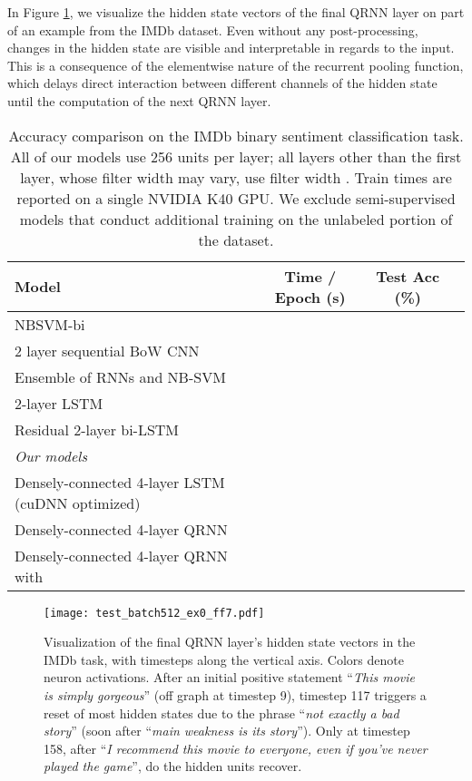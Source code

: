 \documentclass{article} \usepackage{iclr2017_conference,times}
\begin{document}
In Figure \ref{fig:IMDBviz}, we visualize the hidden state vectors  of the final QRNN layer on part of an example from the IMDb dataset.
Even without any post-processing, changes in the hidden state are visible and interpretable in regards to the input. This is a consequence of the elementwise nature of the recurrent pooling function, which delays direct interaction between different channels of the hidden state until the computation of the next QRNN layer.

\begin{table*}
\center
\begin{tabular}{l|ccc}
\toprule
\bf Model & \bf Time / Epoch (s) & \bf Test Acc (\%) \\
\midrule
NBSVM-bi \citep{Wang2012} &  & \\
2 layer sequential BoW CNN \citep{Johnson2014} &  &  \\
Ensemble of RNNs and NB-SVM \citep{Mesnil2014} &  &  \\
2-layer LSTM \citep{Longpre2016} &  &  \\
Residual 2-layer bi-LSTM \citep{Longpre2016} &  &  \\
\midrule
{\it Our models}\\
Densely-connected 4-layer LSTM (cuDNN optimized) &  &  \\
Densely-connected 4-layer QRNN &  &  \\
Densely-connected 4-layer QRNN with  &  &  \\
\bottomrule
\end{tabular}
\caption{
Accuracy comparison on the IMDb binary sentiment classification task. All of our models use 256 units per layer; all layers other than the first layer, whose filter width may vary, use filter width . Train times are reported on a single NVIDIA K40 GPU. We exclude semi-supervised models that conduct additional training on the unlabeled portion of the dataset.
}
\label{table:IMDb}
\end{table*}

\begin{figure}
\centering
\texttt{[image: test\_batch512\_ex0\_ff7.pdf]}
\caption{Visualization of the final QRNN layer's hidden state vectors  in the IMDb task, with timesteps along the vertical axis. Colors denote neuron activations.
After an initial positive statement ``\textit{This movie is simply gorgeous}'' (off graph at timestep 9), timestep 117 triggers a reset of most hidden states due to the phrase ``\textit{not exactly a bad story}'' (soon after ``\textit{main weakness is its story}'').
Only at timestep 158, after ``\textit{I recommend this movie to everyone, even if you've never played the game}'', do the hidden units recover.}
\label{fig:IMDBviz}
\end{figure}
\end{document}
